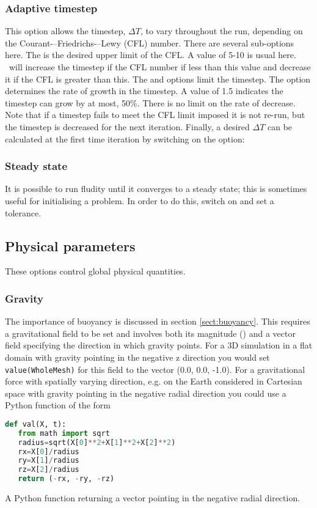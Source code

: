 \subsubsection{Adaptive timestep}

This option allows the timestep, $\Delta T$, to vary throughout the run, depending on the 
Courant-–Friedrichs-–Lewy (CFL) number.  There are several sub-options here. The
 is the desired upper limit of the CFL. A value of 5-10 is usual
here. \fluidity\ will increase the timestep if the CFL number if less than this value and decrease
it if the CFL is greater than this. The  and 
 options limit the timestep. The option 
 determines
the rate of growth in the timestep. A value of 1.5 indicates the timestep can grow by
at most, 50\%. There is no limit on the rate of decrease. Note that if a timestep fails
to meet the CFL limit imposed it is not re-run, but the timestep is decreased for the next
iteration. Finally, a desired $\Delta T$ can be calculated at the first time iteration by
switching on the option: 

\subsubsection{Steady state}
It is possible to run fludity until it converges to a steady state; this is sometimes useful for initialising a problem. In order to do this, switch on  and set a tolerance. 

\subsection{Physical parameters}
These options control global physical quantities.

\subsubsection{Gravity}
The importance of buoyancy is discussed in section \ref{sect:buoyancy}. This
requires a gravitational field to be set and involves both its magnitude
(\eg \mss[9.8]) and a vector field specifying the direction in which gravity
points. For a 3D simulation in a flat domain with gravity pointing in the
negative z direction you would set \verb+value(WholeMesh)+ for this field to
the vector (0.0, 0.0, -1.0). For a gravitational force with spatially
varying direction, e.g. on the Earth considered in Cartesian space with
gravity pointing in the negative radial direction you could use a Python
function of the form
\begin{example}
  \begin{lstlisting}[language=Python]
def val(X, t):
   from math import sqrt
   radius=sqrt(X[0]**2+X[1]**2+X[2]**2)
   rx=X[0]/radius
   ry=X[1]/radius
   rz=X[2]/radius
   return (-rx, -ry, -rz)
  \end{lstlisting}
  \caption{A Python function returning a vector pointing in the negative radial direction.}
\end{example}

